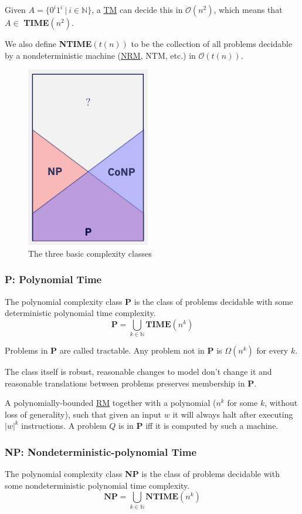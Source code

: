 \documentclass{article}
\begin{document}
Given $A = \{0^i1^i \:|\: i \in \mathbb{N}\}$, a \hyperref[tm]{TM} can decide this in $\mathcal{O}(n^2)$, which means that $A \in$ \textbf{TIME}$(n^2)$.

We also define \textbf{NTIME}$(t(n))$ to be the collection of all problems decidable by a nondeterministic machine (\hyperref[nrm]{NRM}, NTM, etc.) in $\mathcal{O}(t(n))$.

\begin{figure}[H]
    \centering
    \includegraphics[width=0.25\linewidth]{images/basic-complexity-classes.png}
    \caption{The three basic complexity classes}
\end{figure}

\subsubsection{P: Polynomial Time}\label{P}
The polynomial complexity class \textbf{P} is the class of problems decidable with some deterministic polynomial time complexity.
\[\textbf{P} = \bigcup_{k \in \mathbb{N}} \textbf{TIME}(n^k)\]

Problems in \textbf{P} are called tractable. Any problem not in \textbf{P} is $\Omega(n^k)$ for every $k$.

The class itself is robust, reasonable changes to model don't change it and reasonable translations between problems preserves membership in \textbf{P}.

A polynomially-bounded \hyperref[rm]{RM} together with a polynomial ($n^k$ for some $k$, without loss of generality), such that given an input $w$ it will always halt after executing $|w|^k$ instructions. A problem $Q$ is in \textbf{P} iff it is computed by such a machine.

\subsubsection{NP: Nondeterministic-polynomial Time}\label{NP}
The polynomial complexity class \textbf{NP} is the class of problems decidable with some nondeterministic polynomial time complexity.
\[\textbf{NP} = \bigcup_{k \in \mathbb{N}} \textbf{NTIME}(n^k)\]
\end{document}
